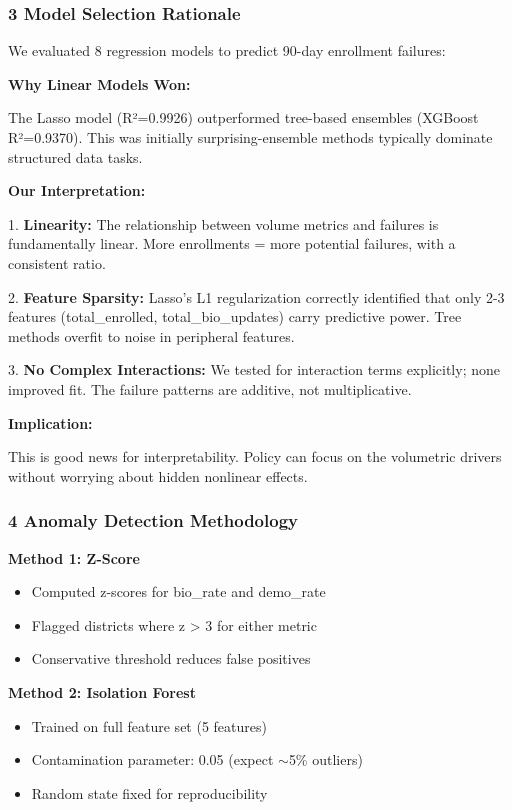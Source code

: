 \documentclass[11pt, a4paper]{article}
\begin{document}
\subsubsection{3 Model Selection Rationale}

We evaluated 8 regression models to predict 90-day enrollment failures:


\textbf{Why Linear Models Won:}


The Lasso model (R²=0.9926) outperformed tree-based ensembles (XGBoost R²=0.9370). This was initially surprising-ensemble methods typically dominate structured data tasks.


\textbf{Our Interpretation:}


1. \textbf{Linearity:} The relationship between volume metrics and failures is fundamentally linear. More enrollments = more potential failures, with a consistent ratio.


2. \textbf{Feature Sparsity:} Lasso's L1 regularization correctly identified that only 2-3 features (total\_enrolled, total\_bio\_updates) carry predictive power. Tree methods overfit to noise in peripheral features.


3. \textbf{No Complex Interactions:} We tested for interaction terms explicitly; none improved fit. The failure patterns are additive, not multiplicative.


\textbf{Implication:}

This is good news for interpretability. Policy can focus on the volumetric drivers without worrying about hidden nonlinear effects.


\subsubsection{4 Anomaly Detection Methodology}

\textbf{Method 1: Z-Score}


\begin{itemize}
\item Computed z-scores for bio\_rate and demo\_rate

\item Flagged districts where \textbar{}z\textbar{} > 3 for either metric

\item Conservative threshold reduces false positives
\end{itemize}

\textbf{Method 2: Isolation Forest}


\begin{itemize}
\item Trained on full feature set (5 features)

\item Contamination parameter: 0.05 (expect $\sim$5\% outliers)

\item Random state fixed for reproducibility
\end{itemize}
\end{document}
